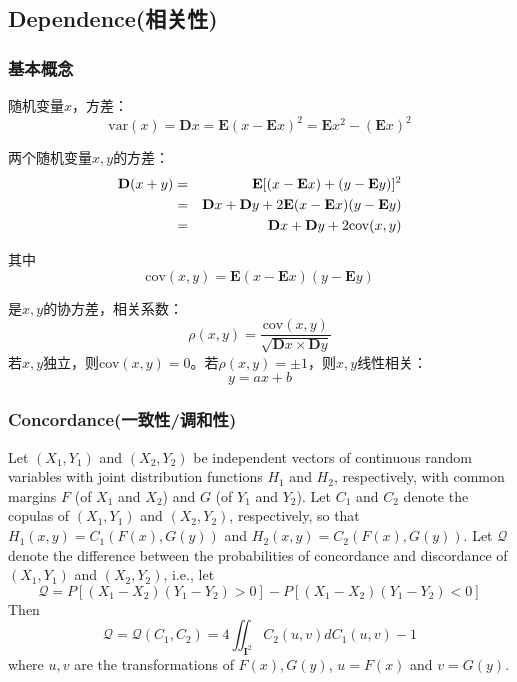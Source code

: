 \subsection{Dependence(相关性)}
\subsubsection{基本概念}
随机变量$x$，方差：
\begin{equation}
    \text{var}(x) = \mathbf{D}x = \mathbf{E}(x-\mathbf{E}x)^2 = \mathbf{E}x^2-(\mathbf{E}x)^2
    \label{eq-var}
\end{equation}

两个随机变量$x,y$的方差：
\begin{eqnarray}
    \mathbf{D}(x+y) &=& \mathbf{E}[(x-\mathbf{E}x) + (y-\mathbf{E}y)]^2 \notag \\
    &=&\mathbf{D}x+\mathbf{D}y+2\mathbf{E}(x-\mathbf{E}x)(y-\mathbf{E}y) \notag \\
    &=&\mathbf{D}x+\mathbf{D}y+2\text{cov}(x,y)
    \label{eq-cov-var}
\end{eqnarray}

其中
\begin{equation}
    \text{cov}(x,y) = \mathbf{E}(x-\mathbf{E}x) (y-\mathbf{E}y)
    \label{eq-covariation}
\end{equation}

是$x,y$的协方差，相关系数：
\begin{equation}
    \rho (x,y) = \dfrac{\text{cov}(x,y)}{\sqrt{\mathbf{D}x\times\mathbf{D}y}}
    \label{eq-coefficient}
\end{equation}
若$x,y$独立，则cov$(x,y) = 0$。若$\rho(x,y) = \pm 1$，则$x,y$线性相关：
\begin{equation*}
    y = ax+b
\end{equation*}


\subsubsection{Concordance(一致性/调和性)}
\begin{theorem}\cite{Bill2000An}
    Let $(X_1,Y_1)$ and $(X_2,Y_2)$ be independent vectors of continuous random variables with joint distribution functions $H_1$ and $H_2$, respectively, with common margins $F$ (of $X_1$ and $X_2$) and $G$ (of $Y_1$ and $Y_2$). Let $C_1$ and $C_2$ denote the copulas of $(X_1,Y_1)$ and $(X_2,Y_2)$, respectively, so that $H_1(x,y) = C_1(F(x), G(y))$ and $H_2(x,y) = C_2(F(x),G(y))$. Let $\mathcal{Q}$ denote the difference between the probabilities of concordance and discordance of $(X_1,Y_1)$ and $(X_2,Y_2)$, i.e., let
    \begin{equation}
        \mathcal{Q} = P [(X_1-X_2)(Y_1-Y_2) > 0] - P[(X_1-X_2)(Y_1-Y_2)<0]
        \label{eq-diff}
    \end{equation}
    Then
    \begin{equation}
        \mathcal{Q} = \mathcal{Q}(C_1,C_2) = 4 \iint_{\mathbf{I}^2}C_2(u,v)dC_1(u,v)-1
        \label{eq-diff2}
    \end{equation}
    where $u,v$ are the transformations of $F(x),G(y)$, $u=F(x)$ and $v = G(y)$.
    \label{th5.1.1}
\end{theorem}

